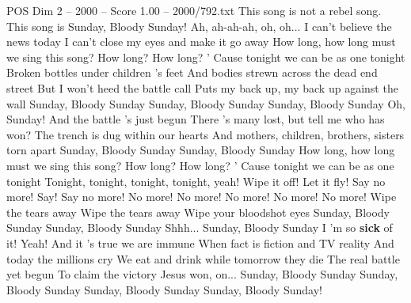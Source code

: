 \begin{textsample}{POS Dim 2 – 2000 – Score 1.00 – 2000/792.txt}  \label{ex:f2_pos_020}
This song is not a rebel song.
This song is Sunday, Bloody Sunday!
Ah, ah-ah-ah, oh, oh...
I can't believe the news today I can't close my eyes and make it go away How long, how long must we sing this song?
How long?
How long? ' Cause tonight we can be as one tonight Broken bottles under children 's feet And bodies strewn across the dead end street But I won't heed the battle call Puts my back up, my back up against the wall Sunday, Bloody Sunday Sunday, Bloody Sunday Sunday, Bloody Sunday Oh, Sunday!
And the battle 's just begun There 's many lost, but tell me who has won?
The trench is dug within our hearts And mothers, children, brothers, sisters torn apart Sunday, Bloody Sunday Sunday, Bloody Sunday How long, how long must we sing this song?
How long?
How long? ' Cause tonight we can be as one tonight Tonight, tonight, tonight, tonight, yeah!
Wipe it off!
Let it fly!
Say no more!
Say!
Say no more!
No more!
No more!
No more!
No more!
No more!
Wipe the tears away Wipe the tears away Wipe your bloodshot eyes Sunday, Bloody Sunday Sunday, Bloody Sunday Shhh...
Sunday, Bloody Sunday I 'm so \textbf{sick} of it!
Yeah!
And it 's true we are immune When fact is fiction and TV reality And today the millions cry We eat and drink while tomorrow they die The real battle yet begun To claim the victory Jesus won, on...
Sunday, Bloody Sunday Sunday, Bloody Sunday Sunday, Bloody Sunday Sunday, Bloody Sunday!

\end{textsample}
